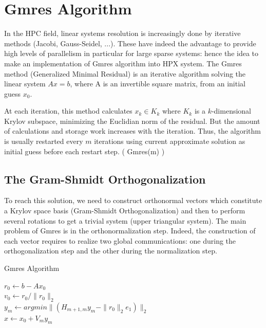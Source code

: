 \documentclass[smallextended]{svjour3}
\begin{document}
\section{Gmres Algorithm}\label{Gmres}
In the HPC field, linear systems resolution is increasingly done by iterative methods \cite{Methodes} (Jacobi, Gauss-Seidel, ...). These have indeed the advantage to provide high levels of parallelism in particular for large sparse systems: hence the idea to make an implementation of Gmres algorithm into HPX system. The Gmres method (Generalized Minimal Residual) \cite{GMRES} is an iterative algorithm solving the linear system $Ax=b$, where A is an invertible square matrix, from an initial guess $x_{0}$.\smallskip

At each iteration, this method calculates $x_{k} \in K_{k}$ where $K_{k}$ is a $k$-dimensional Krylov subspace, minimizing the Euclidian norm of the residual. But the amount of calculations and storage work increases with the iteration. Thus, the algorithm is usually restarted every $m$ iterations using current approximate solution as initial guess before each restart step. ( Gmres(m) ) \cite{GMRES}

\subsection{The Gram-Shmidt Orthogonalization}
To reach this solution, we need to construct orthonormal vectors which constitute a Krylov space basis (Gram-Shmidt Orthogonalization) and then to perform several rotations to get a trivial system (upper triangular system). The main problem of Gmres is in the orthonormalization step. Indeed, the construction of each vector requires to realize two global communications: one during the orthogonalization step and the other during the normalization step.

\begin{algorithm}
\caption{Gmres Algorithm}
$r_0 \gets b-Ax_0$\\  
$v_0 \gets r_0/\|r_0\|_2$\\ 
  $y_m \gets argmin\|(H_{m+1,m}y_m - \|r_0\|_2e_1)\|_2$\\
  $x \gets x_0 + V_my_m$
\end{algorithm}
\end{document}
